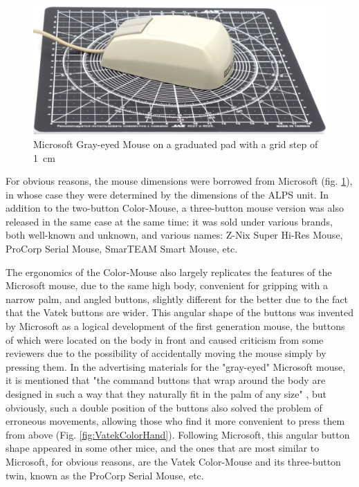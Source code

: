 \documentclass[11pt, a4paper]{article}
\begin{document}
\begin{figure}[h]
    \centering
    \includegraphics[scale=0.4]{1989_vatek_color_mouse/size_30.jpg}
    \caption{Microsoft Gray-eyed Mouse on a graduated pad with a grid step of 1~cm}
    \label{fig:VatekColorSize}
\end{figure}

For obvious reasons, the mouse dimensions were borrowed from Microsoft (fig. \ref{fig:VatekColorSize}), in whose case they were determined by the dimensions of the ALPS unit. In addition to the two-button Color-Mouse, a three-button mouse version was also released in the same case at the same time: it was sold under various brands, both well-known and unknown, and various names: Z-Nix Super Hi-Res Mouse, ProCorp Serial Mouse, SmarTEAM Smart Mouse, etc.

The ergonomics of the Color-Mouse also largely replicates the features of the Microsoft mouse, due to the same high body, convenient for gripping with a narrow palm, and angled buttons, slightly different for the better due to the fact that the Vatek buttons are wider. This angular shape of the buttons was invented by Microsoft as a logical development of the first generation mouse, the buttons of which were located on the body in front and caused criticism from some reviewers due to the possibility of accidentally moving the mouse simply by pressing them. In the advertising materials for the "gray-eyed" Microsoft mouse, it is mentioned that "the command buttons that wrap around the body are designed in such a way that they naturally fit in the palm of any size" \cite{mouses}, but obviously, such a double position of the buttons also solved the problem of erroneous movements, allowing those who find it more convenient to press them from above (Fig. \ref{fig:VatekColorHand}). Following Microsoft, this angular button shape appeared in some other mice, and the ones that are most similar to Microsoft, for obvious reasons, are the Vatek Color-Mouse and its three-button twin, known as the ProCorp Serial Mouse, etc.
\end{document}
